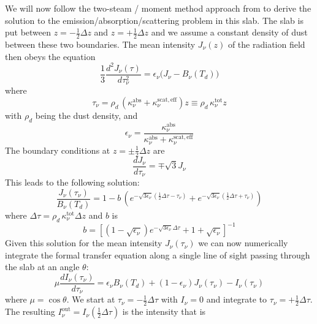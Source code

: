 \documentclass{aa}
\begin{document}
We will now follow the two-steam / moment method approach from
\citet{1986rpa..book.....R} to derive the solution to the
emission/absorption/scattering problem in this slab. The slab is put between
$z=-\tfrac{1}{2}\Delta z$ and $z=+\tfrac{1}{2}\Delta z$ and we assume a constant
density of dust between these two boundaries. The mean intensity $J_\nu(z)$
of the radiation field then obeys the equation
\begin{equation}
\frac{1}{3}\frac{d^2J_\nu(\tau)}{d\tau_\nu^2} = \epsilon_\nu \big(J_\nu-B_\nu(T_d)\big)
\end{equation}
where
\begin{equation}
  \tau_\nu=\rho_d\,(\kappa_\nu^{\mathrm{abs}}+\kappa_\nu^{\mathrm{scat,eff}}) z
  \equiv \rho_d\, \kappa_\nu^{\mathrm{tot}} z
\end{equation}
with $\rho_d$ being the dust density, and
\begin{equation}
\epsilon_\nu = \frac{\kappa_\nu^{\mathrm{abs}}}{\kappa_\nu^{\mathrm{abs}}+\kappa_\nu^{\mathrm{scat,eff}}}
\end{equation}
The boundary conditions at $z=\pm\tfrac{1}{2}\Delta z$ are
\begin{equation}
\frac{dJ_\nu}{d\tau_\nu} = \mp \sqrt{3}J_\nu
\end{equation}
This leads to the following solution:
\begin{equation}
  \frac{J_\nu(\tau_\nu)}{B_\nu(T_d)} =  1-b\,
    \left(e^{-\sqrt{3\epsilon_\nu}\left(\tfrac{1}{2}\Delta\tau-\tau_\nu\right)}+e^{-\sqrt{3\epsilon_\nu}\left(\tfrac{1}{2}\Delta\tau+\tau_\nu\right)}\right)
\end{equation}
where $\Delta\tau = \rho_d\, \kappa_\nu^{\mathrm{tot}} \Delta z$ and $b$ is
\begin{equation}
b = \left[(1-\sqrt{\epsilon_\nu})e^{-\sqrt{3\epsilon_\nu}\Delta\tau} + 1 + \sqrt{\epsilon_\nu}\right]^{-1}
\end{equation}
Given this solution for the mean intensity $J_\nu(\tau_\nu)$ we can now numerically integrate
the formal transfer equation along a single line of sight passing through the slab at an
angle $\theta$:
\begin{equation}\label{eq-fte-slab-with-scat}
  \mu\frac{dI_\nu(\tau_\nu)}{d\tau_\nu} = \epsilon_\nu B_\nu(T_d) + (1-\epsilon_\nu) J_\nu(\tau_\nu)
  -I_\nu(\tau_\nu)
\end{equation}
where $\mu=\cos\theta$. We start at $\tau_\nu=-\tfrac{1}{2}\Delta \tau$ with
$I_\nu=0$ and integrate to $\tau_\nu=+\tfrac{1}{2}\Delta \tau$. The resulting
$I_\nu^{\mathrm{out}}=I_\nu(\tfrac{1}{2}\Delta \tau)$ is the intensity that is
\end{document}
